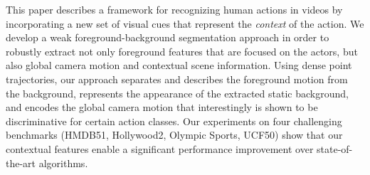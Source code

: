 This paper describes a framework for recognizing human actions in videos by incorporating a new set of visual cues that represent the \emph{context} of the action. We develop a weak foreground-background segmentation approach in order to robustly extract not only foreground features that are focused on the actors, but also global camera motion and contextual scene information. Using dense point trajectories, our approach separates and describes the foreground motion from the background, represents the appearance of the extracted static background, and encodes the global camera motion that interestingly is shown to be discriminative for certain action classes. Our experiments on four challenging benchmarks (HMDB51, Hollywood2, Olympic Sports, UCF50) show that our contextual features enable a significant performance improvement over state-of-the-art algorithms.
